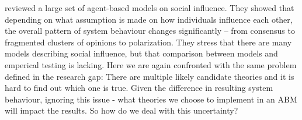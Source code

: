  \cite{Flache2017} reviewed a large set of agent-based models on social influence. They showed that depending on what assumption is made on how individuals influence each other, the overall pattern of system behaviour changes significantly – from consensus to fragmented clusters of opinions to polarization. They stress that there are many models describing social influence, but that comparison between models and emperical testing is lacking. Here we are again confronted with the same problem defined in the research gap: There are multiple likely candidate theories and it is hard to find out which one is true. Given the difference in resulting system behaviour, ignoring this issue - what theories we choose to implement in an ABM will impact the results. So how do we deal with this uncertainty?  \\
 


